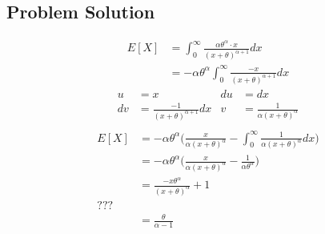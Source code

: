 \documentclass[12pt]{article}
\theoremstyle{definition}
\begin{document}
\subsection*{Problem Solution}
\begin{align*}
E[X] &= \int_0^\infty \frac{\alpha \theta^\alpha \cdot x}{(x + \theta)^{\alpha + 1}}dx\\
&= -\alpha \theta^\alpha \int_0^\infty \frac{-x}{(x + \theta)^{\alpha + 1}}dx
\end{align*}
\begin{align*}
u &= x	&	du &= dx\\
dv &= \frac{-1}{(x + \theta)^{\alpha + 1}}dx	&	v &= \frac{1}{\alpha(x + \theta)^\alpha}\\
\end{align*}
\begin{align*}
E[X] &= -\alpha \theta^\alpha \biggr(\frac{x}{\alpha(x + \theta)^\alpha} - \int_0^\infty \frac{1}{\alpha(x + \theta)^\alpha}dx\biggr)\\
&= -\alpha \theta^\alpha \biggr(\frac{x}{\alpha(x + \theta)^\alpha} - \frac{1}{\alpha\theta^\alpha}\biggr)\\
&= \frac{-x \theta^\alpha}{(x + \theta)^\alpha} + 1 \\
???\\
&= \frac{\theta}{\alpha - 1}
\end{align*}
\end{document}
